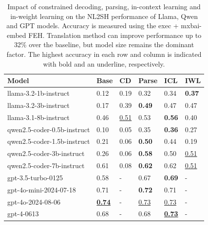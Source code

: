 \documentclass[11pt]{article}
\begin{document}
\begin{table}[ht!]
  \centering
  \scriptsize
  \caption{Impact of constrained decoding, parsing, in-context learning and in-weight learning on the NL2SH performance of Llama, Qwen and GPT models. Accuracy is measured using the exec + mxbai-embed FEH. Translation method can improve performance up to 32\% over the baseline, but model size remains the dominant factor. The highest accuracy in each row and column is indicated with bold and an underline, respectively.}
  \begin{tabular}{llllll}
    \hline
    \textbf{Model}              & \textbf{Base}             & \textbf{CD}      & \textbf{Parse}   & \textbf{ICL}              & \textbf{IWL}     \\
    \hline
    llama-3.2-1b-instruct       & 0.12                      & 0.19             & 0.32             & 0.34                      & \textbf{0.37}    \\
    llama-3.2-3b-instruct       & 0.17                      & 0.39             & \textbf{0.49}    & 0.47                      & 0.47             \\
    llama-3.1-8b-instruct       & 0.46                      & \underline{0.51} & 0.53             & \textbf{0.56}             & 0.40             \\ \hline
    qwen2.5-coder-0.5b-instruct & 0.10                      & 0.05             & 0.35             & \textbf{0.36}             & 0.27             \\
    qwen2.5-coder-1.5b-instruct & 0.21                      & 0.06             & \textbf{0.50}    & 0.44                      & 0.19             \\
    qwen2.5-coder-3b-instruct   & 0.26                      & 0.06             & \textbf{0.58}    & 0.50                      & \underline{0.51} \\
    qwen2.5-coder-7b-instruct   & 0.61                      & 0.08             & \textbf{0.62}    & 0.62                      & \underline{0.51} \\ \hline
    gpt-3.5-turbo-0125          & 0.58                      & -                & 0.67             & \textbf{0.69}             & -                \\
    gpt-4o-mini-2024-07-18      & 0.71                      & -                & \textbf{0.72}    & 0.71                      & -                \\
    gpt-4o-2024-08-06           & \textbf{\underline{0.74}} & -                & \underline{0.73} & \underline{0.73}          & -                \\
    gpt-4-0613                  & 0.68                      & -                & 0.68             & \textbf{\underline{0.73}} & -                \\
    \hline
  \end{tabular}
  \label{tab:model_results}
\end{table}
\end{document}
